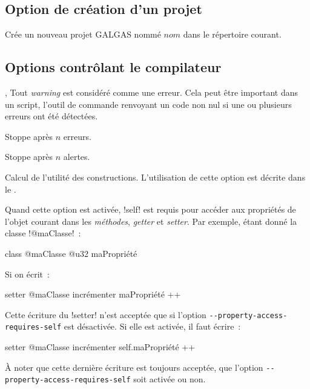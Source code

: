 \subsection{Option de création d'un projet}


 Crée un nouveau projet GALGAS nommé $nom$ dans le répertoire courant.




\subsection{Options contrôlant le compilateur}





,  Tout \emph{warning} est considéré comme une erreur. Cela peut être important dans un script, l’outil de commande renvoyant un code non nul si une ou plusieurs erreurs ont été détectées.

 Stoppe après $n$ erreurs.

 Stoppe après $n$ alertes.

 Calcul de l'utilité des constructions. L'utilisation de cette option est décrite dans le .



 Quand cette option est activée, \ggsq!self! est requis pour accéder aux propriétés de l'objet courant dans les \emph{méthodes}, \emph{getter} et \emph{setter}. Par exemple, étant donné la classe \ggsq!@maClasse!~:

\begin{galgas4}
class @maClasse {
  @u32 maPropriété
}
\end{galgas4}

Si on écrit~:
\begin{galgas4}
setter @maClasse incrémenter {
  maPropriété ++
}
\end{galgas4}

Cette écriture du \ggsq!setter! n'est acceptée que si l'option \texttt{-{-}property-access-requires-self} est désactivée. Si elle est activée, il faut écrire~:
\begin{galgas4}
setter @maClasse incrémenter {
  self.maPropriété ++
}
\end{galgas4}

À noter que cette dernière écriture est toujours acceptée, que l'option \texttt{-{-}property-access-requires-self} soit activée ou non.



